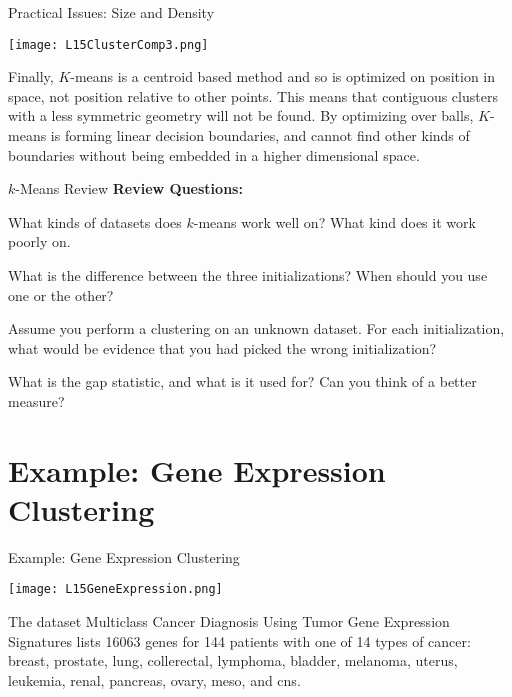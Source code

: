 \documentclass[10pt, table, dvipsnames,xcdraw,handout]{beamer}
\begin{document}
\begin{frame}[fragile]{Practical Issues: Size and Density}
  \begin{minipage}[t][0.5\textheight][t]{\textwidth}
	\centering \texttt{[image: L15ClusterComp3.png]} 
  \end{minipage}
  \vfill
\begin{minipage}[t][0.5\textheight][t]{\textwidth}
Finally, $K$-means is a centroid based method and so is optimized on position in space, not position relative to other points. This means that contiguous clusters with a less symmetric geometry will not be found. \pause By optimizing over balls, $K$-means is forming linear decision boundaries, and cannot find other kinds of boundaries without being embedded in a higher dimensional space. 
\end{minipage}
\end{frame}




\begin{frame}[fragile]{$k$-Means Review}
\textbf{Review Questions:}

What kinds of datasets does $k$-means work well on? What kind does it work poorly on. 

What is the difference between the three initializations? When should you use one or the other?  

Assume you perform a clustering on an unknown dataset. For each initialization, what would be evidence that you had picked the wrong initialization?

What is the gap statistic, and what is it used for? Can you think of a better measure?
\end{frame}













\section{Example: Gene Expression Clustering}
\begin{frame}[fragile]{Example: Gene Expression Clustering}
  \begin{minipage}[t][0.5\textheight][t]{\textwidth}
	\centering \texttt{[image: L15GeneExpression.png]} 
  \end{minipage}
  \vfill
\begin{minipage}[t][0.5\textheight][t]{\textwidth}
The dataset Multiclass Cancer Diagnosis Using Tumor Gene Expression Signatures lists 16063 genes for 144 patients with one of 14 types of cancer: breast, prostate, lung, collerectal, lymphoma, bladder, melanoma, uterus, leukemia, renal, pancreas, ovary, meso, and cns.

\end{minipage}
\end{frame}
\end{document}
